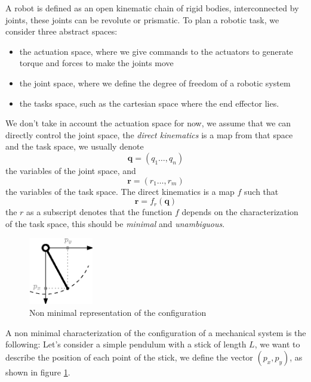 \documentclass[10pt, letterpaper]{report}
\begin{document}
A robot is defined as an open kinematic chain of rigid bodies, interconnected by joints, these joints can be revolute or prismatic. To plan a robotic task, we consider three abstract spaces:\begin{itemize}
    \item the actuation space, where we give commands to the actuators to generate torque and forces to make the joints move 
    \item the joint space, where we define the degree of freedom of a robotic system 
    \item the tasks space, such as the cartesian space where the end effector lies. 
\end{itemize}
We don't take in account the actuation space for now, we assume that we can directly control the joint space, the \textit{direct kinematics} is a map from that space and the task space, we usually denote\begin{equation}
    \mathbf q =(q_1\dots, q_n) 
\end{equation}
the variables of the joint space, and\begin{equation}
    \mathbf r = (r_1\dots ,r_m) 
\end{equation}
the variables of the task space. The direct kinematics is a map $f$ such that\begin{equation}
    \mathbf r=f_r(\mathbf q)
\end{equation}
the $r$ as a subscript denotes that the function $f$ depends on the characterization of the task space, this should be \textit{minimal} and \textit{unambiguous}.\bigskip

\begin{figure}[h!]
    \centering
    \includegraphics[width=0.25\textwidth ]{images/pendulum.eps}
    \caption{Non minimal representation of the configuration}
    \label{fig:pendulum}
\end{figure}


A non minimal characterization of the configuration of a mechanical system is the following: Let's consider a simple pendulum with a stick of length $L$, we want to describe the position of each point of the stick, we define the vector $(p_x,p_y)$, as shown in figure \ref{fig:pendulum}.
\end{document}
